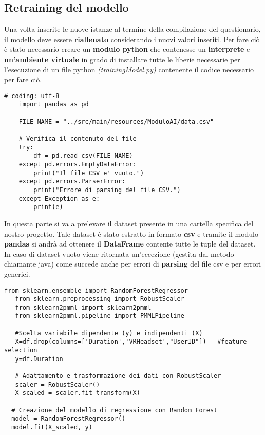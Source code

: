 \subsection{Retraining del modello}
\fancyhead{}    %
\label{paragrafo 5.3}

Una volta inserite le nuove istanze al termine della compilazione del questionario, il modello deve essere \textbf{riallenato} considerando i nuovi valori inseriti.\vspace{1ex}
Per fare ciò è stato necessario creare un \textbf{modulo python} che contenesse un \textbf{interprete} e \textbf{un'ambiente virtuale} in grado di installare tutte le liberie necessarie per l'esecuzione di un file python \textcolor{gray!50!black}{\textit{(trainingModel.py)}} contenente il codice necessario per fare ciò. \\ 

\begin{lstlisting}[caption=Prelievo del dataset]
    # coding: utf-8
    import pandas as pd
    
    FILE_NAME = "../src/main/resources/ModuloAI/data.csv"
    
    # Verifica il contenuto del file
    try:
        df = pd.read_csv(FILE_NAME)
    except pd.errors.EmptyDataError:
        print("Il file CSV e' vuoto.")
    except pd.errors.ParserError:
        print("Errore di parsing del file CSV.")
    except Exception as e:
        print(e)
\end{lstlisting} 

In questa parte si va a prelevare il dataset presente in una cartella specifica del nostro progetto.
Tale dataset è stato estratto in formato \textbf{csv} e tramite il modulo \textbf{pandas} si andrà ad ottenere il \textbf{DataFrame} contente tutte le tuple del dataset.\vspace{1ex}\\
In caso di dataset vuoto viene ritornata un'eccezione (gestita dal metodo chiamante java) come succede anche per errori di \textbf{parsing} del file csv e per errori generici. \\

\begin{lstlisting}[caption=Feature preparation]
   from sklearn.ensemble import RandomForestRegressor
   from sklearn.preprocessing import RobustScaler
   from sklearn2pmml import sklearn2pmml
   from sklearn2pmml.pipeline import PMMLPipeline

   #Scelta variabile dipendente (y) e indipendenti (X)
   X=df.drop(columns=['Duration','VRHeadset',"UserID"])   #feature selection
   y=df.Duration

   # Adattamento e trasformazione dei dati con RobustScaler
   scaler = RobustScaler()
   X_scaled = scaler.fit_transform(X)

  # Creazione del modello di regressione con Random Forest
  model = RandomForestRegressor()
  model.fit(X_scaled, y)
\end{lstlisting} 

